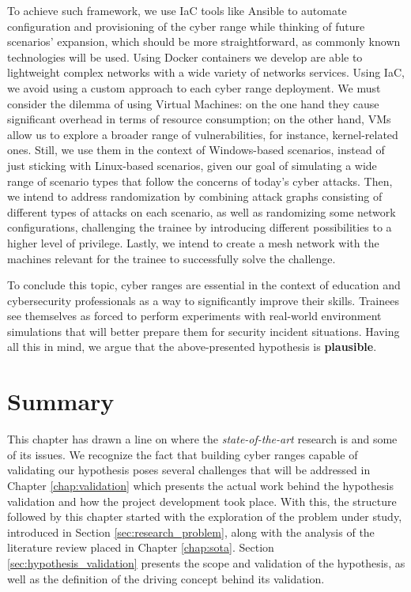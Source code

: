 To achieve such framework, we use IaC tools like Ansible to automate configuration and provisioning of the cyber range while thinking of future scenarios' expansion, which should be more straightforward, as commonly known technologies will be used. Using Docker containers we develop are able to lightweight complex networks with a wide variety of networks services. Using IaC, we avoid using a custom approach to each cyber range deployment. We must consider the dilemma of using Virtual Machines: on the one hand they cause significant overhead in terms of resource consumption; on the other hand, VMs allow us to explore a broader range of vulnerabilities, for instance, kernel-related ones. Still, we use them in the context of Windows-based scenarios, instead of just sticking with Linux-based scenarios, given our goal of simulating a wide range of scenario types that follow the concerns of today's cyber attacks. Then, we intend to address randomization by combining attack graphs consisting of different types of attacks on each scenario, as well as randomizing some network configurations, challenging the trainee by introducing different possibilities to a higher level of privilege. Lastly, we intend to create a mesh network with the machines relevant for the trainee to successfully solve the challenge.

To conclude this topic, cyber ranges are essential in the context of education and cybersecurity professionals as a way to significantly improve their skills. Trainees see themselves as forced to perform experiments with real-world environment simulations that will better prepare them for security incident situations. Having all this in mind, we argue that the above-presented hypothesis is \textbf{plausible}.

\section{Summary} \label{sec:problem_summary}

This chapter has drawn a line on where the \textit{state-of-the-art} research is and some of its issues. We recognize the fact that building cyber ranges capable of validating our hypothesis poses several challenges that will be addressed in Chapter \ref{chap:validation} which presents the actual work behind the hypothesis validation and how the project development took place. With this, the structure followed by this chapter started with the exploration of the problem under study, introduced in Section \ref{sec:research_problem}, along with the analysis of the literature review placed in Chapter \ref{chap:sota}. Section \ref{sec:hypothesis_validation} presents the scope and validation of the hypothesis, as well as the definition of the driving concept behind its validation.
